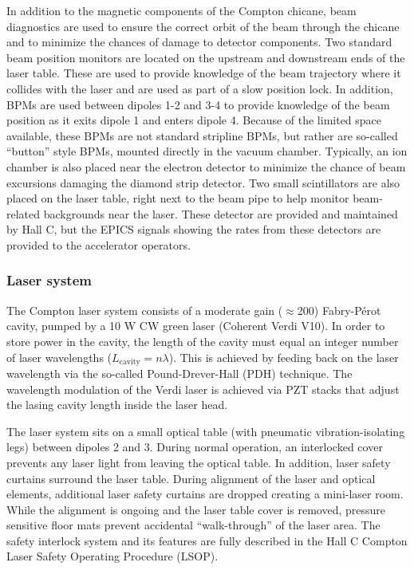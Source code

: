 {In addition to the magnetic components of the Compton chicane, beam diagnostics are used to ensure the
correct orbit of the beam through the chicane and to minimize the chances of damage to detector components.
Two standard beam position monitors are located on the upstream and downstream ends of the laser table. These
are used to provide knowledge of the beam trajectory where it collides with the laser and are used
as part of a slow position lock. In addition, BPMs are used between dipoles 1-2 and 3-4 to provide knowledge
of the beam position as it exits dipole 1 and enters dipole 4. Because of the limited space available,
these BPMs are not standard stripline BPMs, but rather are so-called ``button'' style BPMs, mounted
directly in the vacuum chamber. Typically, an ion chamber is also placed near the electron  detector
to minimize the chance of beam excursions damaging the diamond strip detector. Two small scintillators
are also placed on the laser table, right next to the beam pipe to help monitor beam-related backgrounds
near the laser. These detector are provided and maintained by Hall C, but the EPICS signals showing the rates
from these detectors are provided to the accelerator operators.


\subsubsection{Laser system}
The Compton laser system consists of a moderate gain ($\approx$200) Fabry-P\'{e}rot cavity, pumped by a 10 W
CW green laser (Coherent Verdi V10). In order to store power in the cavity, the length of the cavity must
equal an integer number of laser wavelengths ($L_{\textrm{cavity}}=n\lambda$). This is achieved by feeding back
on the laser wavelength via the so-called Pound-Drever-Hall (PDH) technique. The wavelength modulation
of the Verdi laser is achieved via PZT stacks that adjust the lasing cavity length inside the laser head.

The laser system sits on a small optical table (with pneumatic vibration-isolating legs) between
dipoles 2 and 3. During normal operation, an interlocked cover prevents any laser light from leaving
the optical table. In addition, laser safety curtains surround the laser table. During alignment of
the laser and optical elements, additional laser safety curtains are dropped creating a mini-laser room.
While the alignment is ongoing and the laser table cover is removed, pressure sensitive floor mats prevent
accidental ``walk-through'' of the laser area. The safety interlock system and its features are fully
described in the Hall C Compton Laser Safety Operating Procedure (LSOP). 

}
